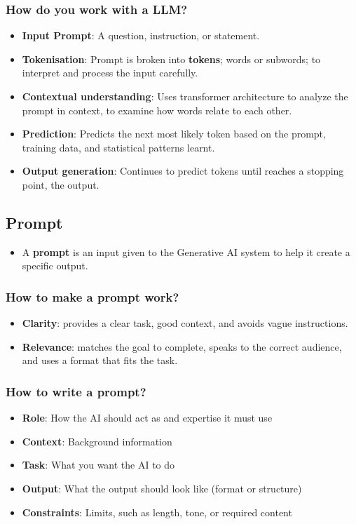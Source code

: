 \documentclass[12pt, letterpaper]{article}
\begin{document}
\subsubsection{How do you work with a LLM?}
\begin{itemize}
    \item \textbf{Input Prompt}: A question, instruction, or statement.
    \item \textbf{Tokenisation}: Prompt is broken into \textbf{tokens}; words or subwords; to interpret and process the input carefully.
    \item \textbf{Contextual understanding}: Uses transformer architecture to analyze the prompt in context, to examine how words relate to each other.
    \item \textbf{Prediction}: Predicts the next most likely token based on the prompt, training data, and statistical patterns learnt.
    \item \textbf{Output generation}: Continues to predict tokens until reaches a stopping point, the output.
\end{itemize}

\subsection{Prompt}
\begin{itemize}
    \item A \textbf{prompt} is an input given to the Generative AI system to help it create a specific output.
\end{itemize}

\subsubsection{How to make a prompt work?}
\begin{itemize}
    \item \textbf{Clarity}: provides a clear task, good context, and avoids vague instructions.
    \item \textbf{Relevance}: matches the goal to complete, speaks to the correct audience, and uses a format that fits the task.
\end{itemize}

\subsubsection{How to write a prompt?}
\begin{itemize}
    \item \textbf{Role}: How the AI should act as and expertise it must use 
    \item \textbf{Context}: Background information 
    \item \textbf{Task}: What you want the AI to do
    \item \textbf{Output}: What the output should look like (format or structure)
    \item \textbf{Constraints}: Limits, such as length, tone, or required content
\end{itemize}
\end{document}
